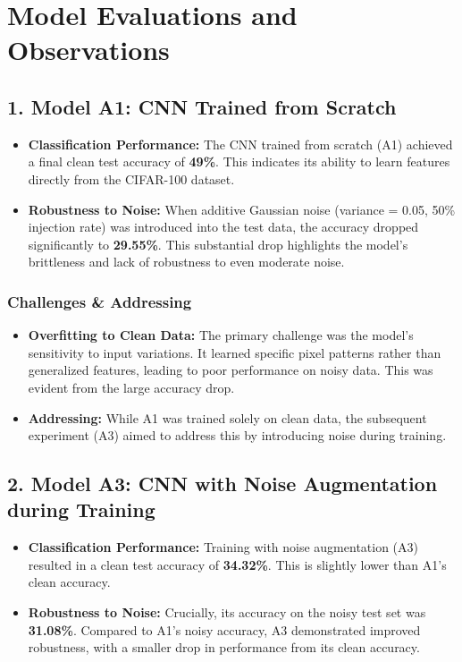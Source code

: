 \documentclass{article}
\begin{document}
\section*{Model Evaluations and Observations}

\subsection*{1. Model A1: CNN Trained from Scratch}

\begin{itemize}
    \item \textbf{Classification Performance:} The CNN trained from scratch (A1) achieved a final clean test accuracy of \textbf{49\%}. This indicates its ability to learn features directly from the CIFAR-100 dataset.
    \item \textbf{Robustness to Noise:} When additive Gaussian noise (variance = 0.05, 50\% injection rate) was introduced into the test data, the accuracy dropped significantly to \textbf{29.55\%}. This substantial drop highlights the model's brittleness and lack of robustness to even moderate noise.
\end{itemize}

\subsubsection*{Challenges \& Addressing}
\begin{itemize}
    \item \textbf{Overfitting to Clean Data:} The primary challenge was the model's sensitivity to input variations. It learned specific pixel patterns rather than generalized features, leading to poor performance on noisy data. This was evident from the large accuracy drop.
    \item \textbf{Addressing:} While A1 was trained solely on clean data, the subsequent experiment (A3) aimed to address this by introducing noise during training.
\end{itemize}

\subsection*{2. Model A3: CNN with Noise Augmentation during Training}

\begin{itemize}
    \item \textbf{Classification Performance:} Training with noise augmentation (A3) resulted in a clean test accuracy of \textbf{34.32\%}. This is slightly lower than A1's clean accuracy.
    \item \textbf{Robustness to Noise:} Crucially, its accuracy on the noisy test set was \textbf{31.08\%}. Compared to A1's noisy accuracy, A3 demonstrated improved robustness, with a smaller drop in performance from its clean accuracy.
\end{itemize}
\end{document}
